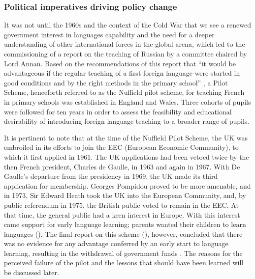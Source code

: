 \documentclass[output=paper]{langscibook}
\begin{document}
\subsubsection{Political imperatives driving policy change}

It was not until the 1960s and the context of the Cold War that we see a renewed government interest in languages capability and the need for a deeper understanding of other international forces in the global arena, which led to the commissioning of a report on the teaching of Russian by a committee chaired by Lord Annan. Based on the recommendations of this report that ``it would be advantageous if the regular teaching of a first foreign language were started in good conditions and by the right methods in the primary school'' \citep{Annan1962}, a Pilot Scheme, henceforth referred to as the Nuffield pilot scheme, for teaching French in primary schools was established in England and Wales. Three cohorts of pupils were followed for ten years in order to assess the feasibility and educational desirability of introducing foreign language teaching to a broader range of pupils. 

It is pertinent to note that at the time of the Nuffield Pilot Scheme, the UK was embroiled in its efforts to join the EEC (European Economic Community), to which it first applied in 1961. The UK applications had been vetoed twice by the then French president, Charles de Gaulle, in 1963 and again in 1967. With De Gaulle’s departure from the presidency in 1969, the UK made its third application for membership. Georges Pompidou proved to be more amenable, and in 1973, Sir Edward Heath took the UK into the European Community, and, by public referendum in 1975, the British public voted to remain in the EEC. At that time, the general public had a keen interest in Europe. With this interest came support for early language learning; parents wanted their children to learn languages (\citealt{Burstall1975}).  The final report on this scheme (\citealt{BurstallEtAl1974}), however, concluded that there was no evidence for any advantage conferred by an early start to language learning, resulting in the withdrawal of government funds \citep{Tellier2019}. The reasons for the perceived failure of the pilot and the lessons that should have been learned will be discussed later. 
\end{document}
